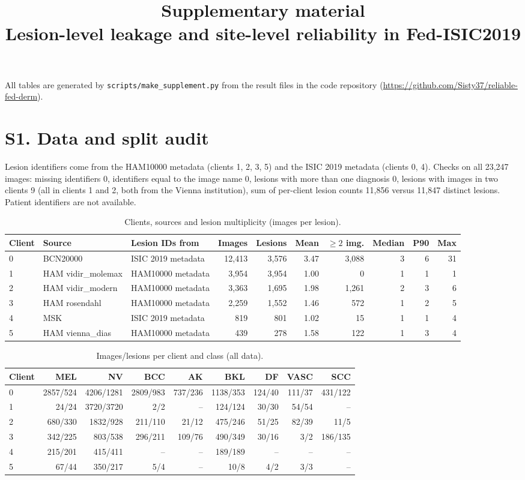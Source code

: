 \documentclass[10pt]{article}
\title{Supplementary material\\[4pt]\large Lesion-level leakage and site-level reliability in Fed-ISIC2019}
\date{}
\begin{document}
\maketitle
All tables are generated by \texttt{scripts/make\_supplement.py} from the result files in the code repository
(\url{https://github.com/Sisty37/reliable-fed-derm}).
\section*{S1. Data and split audit}
Lesion identifiers come from the HAM10000 metadata (clients 1, 2, 3, 5) and the ISIC 2019 metadata (clients 0, 4). Checks on all 23,247 images: missing identifiers 0, identifiers equal to the image name 0, lesions with more than one diagnosis 0, lesions with images in two clients 9 (all in clients 1 and 2, both from the Vienna institution), sum of per-client lesion counts 11,856 versus 11,847 distinct lesions. Patient identifiers are not available.
\begin{table}[!htbp]
\centering
\footnotesize
\caption{Clients, sources and lesion multiplicity (images per lesion).}
\label{tab:s1prov}
\begin{tabular}{@{}llp{2.6cm}rrrrrrr@{}}
\toprule
Client & Source & Lesion IDs from & Images & Lesions & Mean & $\ge2$ img. & Median & P90 & Max \\
\midrule
0 & BCN20000 & ISIC 2019 metadata & 12,413 & 3,576 & 3.47 & 3,088 & 3 & 6 & 31 \\
1 & HAM vidir\_molemax & HAM10000 metadata & 3,954 & 3,954 & 1.00 & 0 & 1 & 1 & 1 \\
2 & HAM vidir\_modern & HAM10000 metadata & 3,363 & 1,695 & 1.98 & 1,261 & 2 & 3 & 6 \\
3 & HAM rosendahl & HAM10000 metadata & 2,259 & 1,552 & 1.46 & 572 & 1 & 2 & 5 \\
4 & MSK & ISIC 2019 metadata & 819 & 801 & 1.02 & 15 & 1 & 1 & 4 \\
5 & HAM vienna\_dias & HAM10000 metadata & 439 & 278 & 1.58 & 122 & 1 & 3 & 4 \\
\bottomrule
\end{tabular}
\end{table}
\begin{table}[!htbp]
\centering
\footnotesize
\caption{Images/lesions per client and class (all data).}
\label{tab:s1cls}
\begin{tabular}{@{}lrrrrrrrr@{}}
\toprule
Client & MEL & NV & BCC & AK & BKL & DF & VASC & SCC \\
\midrule
0 & 2857/524 & 4206/1281 & 2809/983 & 737/236 & 1138/353 & 124/40 & 111/37 & 431/122 \\
1 & 24/24 & 3720/3720 & 2/2 & -- & 124/124 & 30/30 & 54/54 & -- \\
2 & 680/330 & 1832/928 & 211/110 & 21/12 & 475/246 & 51/25 & 82/39 & 11/5 \\
3 & 342/225 & 803/538 & 296/211 & 109/76 & 490/349 & 30/16 & 3/2 & 186/135 \\
4 & 215/201 & 415/411 & -- & -- & 189/189 & -- & -- & -- \\
5 & 67/44 & 350/217 & 5/4 & -- & 10/8 & 4/2 & 3/3 & -- \\
\bottomrule
\end{tabular}
\end{table}
\end{document}
